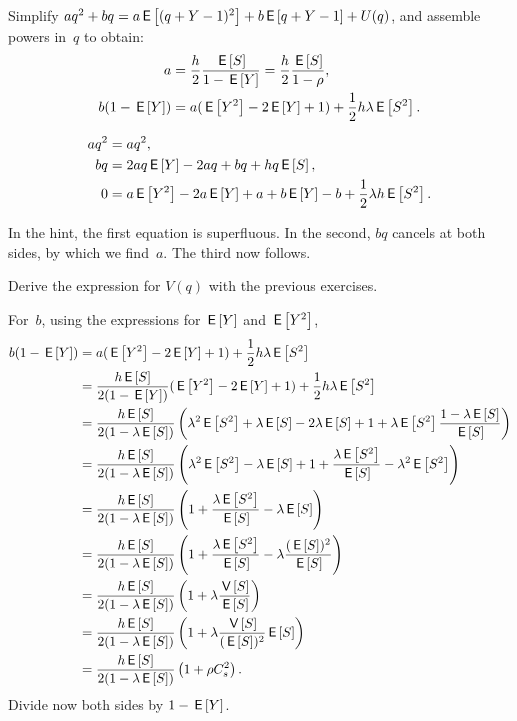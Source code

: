 \documentclass[stochastic-or.tex]{subfiles}
\begin{document}
\begin{exercise}\label{ex:68}
Simplify $a q^2 +b q = a\E{(q+Y-1)^2} + b\E{q+Y-1}+ U(q)$, and assemble powers in~$q$ to obtain:
\begin{align*}
  a &= \frac h 2 \frac{\E S}{1-\E Y} = \frac{h}{2} \frac{\E S}{1- \rho}, \\
  b(1-\E Y) &= a(\E{Y^2} - 2 \E Y + 1) + \frac 12 h \lambda \E{S^2}.
\end{align*}
\begin{hint}
\begin{align*}
  a q^2 &= a q^2, \\
  b q &= 2a q \E Y - 2a q + b q + h q \E S,\\
  0 &= a \E{Y^2} - 2a \E Y + a + b \E Y - b + \frac 12 \lambda h \E{S^2}.
\end{align*}
\end{hint}
\begin{solution}
  In the hint, the first equation is superfluous.
  In the second, $bq$ cancels at both sides, by which we find~$a$.
  The third now follows.
\end{solution}
\end{exercise}








\begin{extra}\label{ex:nm-2}
Derive
 the expression for $V(q)$ with the previous exercises.
\begin{solution}
  For~$b$, using the expressions for $\E Y$ and $\E{Y^2}$,
\begin{align*}
b(1-\E Y) &= a(\E{Y^2} - 2 \E Y + 1) + \frac 12 h \lambda \E{S^2} \\
&= \frac{h \E S}{2(1-\E Y)} (\E{Y^2} - 2 \E Y + 1) + \frac 12 h \lambda \E{S^2} \\
&= \frac{h \E S}{2(1-\lambda \E S)} \left(\lambda^2 \E{S^2} + \lambda \E S - 2 \lambda \E S + 1 +  \lambda \E{S^2}\frac{1-\lambda \E S}{\E S}\right) \\
&= \frac{h \E S}{2(1-\lambda \E S)} \left(\lambda^2 \E{S^2} - \lambda \E S + 1 +  \frac{\lambda \E{S^2}}{\E S} - \lambda^2 \E{S^2}\right) \\
&= \frac{h \E S}{2(1-\lambda \E S)} \left(1+ \frac{\lambda \E{S^2}}{\E S }  - \lambda \E S \right) \\
&= \frac{h \E S}{2(1-\lambda \E S)} \left( 1+ \frac{\lambda \E{S^2}}{\E S }  - \lambda \frac{(\E S)^2}{\E S}\right) \\
&= \frac{h \E S}{2(1-\lambda \E S)} \left( 1+ \lambda \frac{\V{S}}{\E S }\right)\\
&= \frac{h \E S}{2(1-\lambda \E S)} \left( 1+ \lambda \frac{\V{S}}{(\E S)^2 } \E S\right)\\
&= \frac{h \E S}{2(1-\lambda \E S)} \left( 1+ \rho C_s^2\right).
\end{align*}
Divide now both sides by $1-\E Y$.
\end{solution}
\end{extra}
\end{document}
